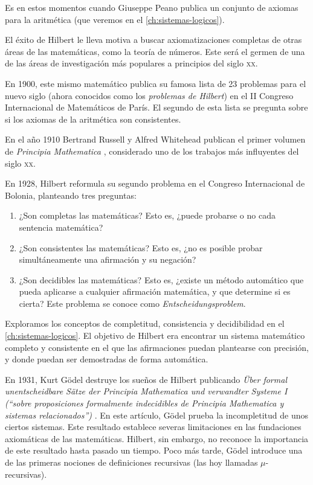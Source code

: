 Es en estos momentos cuando Giuseppe Peano publica un conjunto de axiomas para la aritmética (que veremos en el \cref{ch:sistemas-logicos}).

El éxito de Hilbert le lleva motiva a buscar axiomatizaciones completas de otras áreas de las matemáticas, como la teoría de números. Este será el germen de una de las áreas de investigación más populares a principios del siglo \textsc{xx}.

En 1900, este mismo matemático publica su famosa lista de 23 problemas para el nuevo siglo (ahora conocidos como los \emph{problemas de Hilbert}) en el II Congreso Internacional de Matemáticos de París. El segundo de esta lista se pregunta sobre si los axiomas de la aritmética son consistentes. \cite{Hilbert1902}

En el año 1910 Bertrand Russell y Alfred Whitehead publican el primer volumen de \emph{Principia Mathematica} \cite{Whitehead1927}, considerado uno de los trabajos más influyentes del siglo \textsc{xx}.

En 1928, Hilbert reformula su segundo problema en el Congreso Internacional de Bolonia, planteando tres preguntas:

\begin{enumerate}[label=(\arabic*)]
    \item ¿Son completas las matemáticas? Esto es, ¿puede probarse o no cada sentencia matemática?
    \item ¿Son consistentes las matemáticas? Esto es, ¿no es posible probar simultáneamente una afirmación y su negación?
    \item ¿Son decidibles las matemáticas? Esto es, ¿existe un método automático que pueda aplicarse a cualquier afirmación matemática, y que determine si es cierta? Este problema se conoce como \emph{Entscheidungsproblem}.
\end{enumerate}

Exploramos los conceptos de completitud, consistencia y decidibilidad en el \cref{ch:sistemas-logicos}. El objetivo de Hilbert era encontrar un sistema matemático completo y consistente en el que las afirmaciones puedan plantearse con precisión, y donde puedan ser demostradas de forma automática.

En 1931, Kurt Gödel destruye los sueños de Hilbert publicando \emph{Über formal unentscheidbare Sätze der Principia Mathematica und verwandter Systeme I} \textit{(``sobre proposiciones formalmente indecidibles de Principia Mathematica y sistemas relacionados'')} \cite{Godel1931}. En este artículo, Gödel prueba la incompletitud de unos ciertos sistemas. Este resultado establece severas limitaciones en las fundaciones axiomáticas de las matemáticas. Hilbert, sin embargo, no reconoce la importancia de este resultado hasta pasado un tiempo. Poco más tarde, Gödel introduce una de las primeras nociones de definiciones recursivas (las hoy llamadas $\mu$-recursivas).

